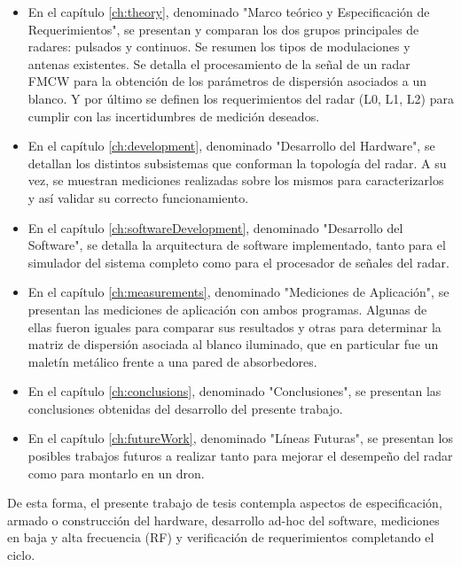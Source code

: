 \begin{itemize}
	\item En el capítulo \ref{ch:theory}, denominado "Marco teórico y Especificación de Requerimientos", se presentan y comparan los dos grupos principales de radares: pulsados y continuos. Se resumen los tipos de modulaciones y antenas existentes. Se detalla el procesamiento de la señal de un radar FMCW para la obtención de los parámetros de dispersión asociados a un blanco. Y por último se definen los requerimientos del radar (L0, L1, L2) para cumplir con las incertidumbres de medición deseados.

    \item En el capítulo \ref{ch:development}, denominado "Desarrollo del Hardware", se detallan los distintos subsistemas que conforman la topología del radar. A su vez, se muestran mediciones realizadas sobre los mismos para caracterizarlos y así validar su correcto funcionamiento.

    \item En el capítulo \ref{ch:softwareDevelopment}, denominado "Desarrollo del Software", se detalla la arquitectura de software implementado, tanto para el simulador del sistema completo como para el procesador de señales del radar.

    \item En el capítulo \ref{ch:measurements}, denominado "Mediciones de Aplicación", se presentan las mediciones de aplicación con ambos programas. Algunas de ellas fueron iguales para comparar sus resultados y otras para determinar la matriz de dispersión asociada al blanco iluminado, que en particular fue un maletín metálico frente a una pared de absorbedores.

    \item En el capítulo \ref{ch:conclusions}, denominado "Conclusiones", se presentan las conclusiones obtenidas del desarrollo del presente trabajo.

    \item En el capítulo \ref{ch:futureWork}, denominado "Líneas Futuras", se presentan los posibles trabajos futuros a realizar tanto para mejorar el desempeño del radar como para montarlo en un dron.
\end{itemize}

De esta forma, el presente trabajo de tesis contempla aspectos de especificación, armado o construcción del hardware, desarrollo ad-hoc del software, mediciones en baja y alta frecuencia (RF) y verificación de requerimientos completando el ciclo.
